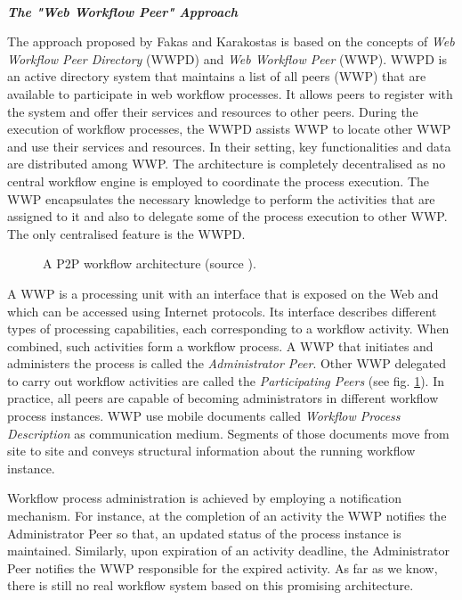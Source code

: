 ~

\noindent\textbf{\textit{The "Web Workflow Peer" Approach \cite{fakas04}}}

The approach proposed by Fakas and Karakostas is based on the concepts of \textit{Web Workflow Peer Directory} (WWPD) and \textit{Web Workflow Peer} (WWP). WWPD is an active directory system that maintains a list of all peers (WWP) that are available to participate in web workflow processes. It allows peers to register with the system and offer their services and resources to other peers. During the execution of workflow processes, the WWPD assists WWP to locate other WWP and use their services and resources. In their setting, key functionalities and data are distributed among WWP. The architecture is completely decentralised as no central workflow engine is employed to coordinate the process execution. The WWP encapsulates the necessary knowledge to perform the activities that are assigned to it and also to delegate some of the process execution to other WWP. The only centralised feature is the WWPD.
\begin{figure}[ht!]
	\noindent
	\caption{A P2P workflow architecture (source \cite{fakas04}).}
	\label{chap1:fig:wwp}
\end{figure}

A WWP is a processing unit with an interface that is exposed on the Web and which can be accessed using Internet protocols. Its interface describes different types of processing capabilities, each corresponding to a workflow activity. When combined, such activities form a workflow process. A WWP that initiates and administers the process is called the \textit{Administrator Peer}. Other WWP delegated to carry out workflow activities are called the \textit{Participating Peers} (see fig. \ref{chap1:fig:wwp}). In practice, all peers are capable of becoming administrators in different workflow process instances. WWP use mobile documents called \textit{Workflow Process Description} as communication medium. Segments of those documents move from site to site and conveys structural information about the running workflow instance.

Workflow process administration is achieved by employing a notification mechanism. For instance, at the completion of an activity the WWP notifies the Administrator Peer so that, an updated status of the process instance is maintained. Similarly, upon expiration of an activity deadline, the  Administrator Peer notifies the WWP responsible for the expired activity. As far as we know, there is still no real workflow system based on this promising architecture.


